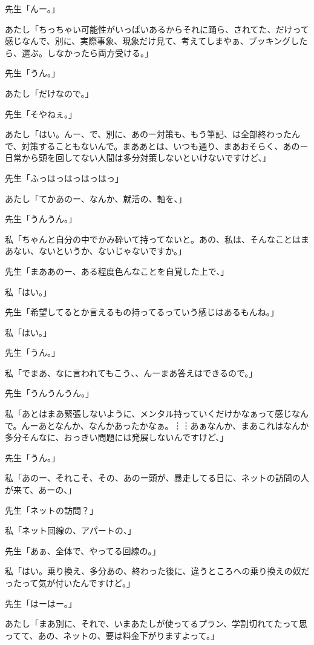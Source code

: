 \documentclass[b5j,twoside,twocolumn]{utarticle}
\begin{document}
\begin{description}
\item 先生「んー。」
\item あたし「ちっちゃい可能性がいっぱいあるからそれに踊ら、されてた、だけって感じなんで、別に、実際事象、現象だけ見て、考えてしまやぁ、ブッキングしたら、選ぶ。しなかったら両方受ける。」
\item 先生「うん。」
\item あたし「だけなので。」
\item 先生「そやねぇ。」
\item あたし「はい。んー、で、別に、あのー対策も、もう筆記、は全部終わったんで、対策することもないんで。まああとは、いつも通り、まあおそらく、あのー日常から頭を回してない人間は多分対策しないといけないですけど、」
\item 先生「ふっはっはっはっはっ」
\item あたし「てかあのー、なんか、就活の、軸を、」
\item 先生「うんうん。」
\item 私「ちゃんと自分の中でかみ砕いて持ってないと。あの、私は、そんなことはまあない、ないというか、ないじゃないですか。」
\item 先生「まああのー、ある程度色んなことを自覚した上で、」
\item 私「はい。」
\item 先生「希望してるとか言えるもの持ってるっていう感じはあるもんね。」
\item 私「はい。」
\item 先生「うん。」
\item 私「でまあ、なに言われてもこう、、んーまあ答えはできるので。」
\item 先生「うんうんうん。」
\item 私「あとはまあ緊張しないように、メンタル持っていくだけかなぁって感じなんで。んーあとなんか、なんかあったかなぁ。︙︙あぁなんか、まあこれはなんか多分そんなに、おっきい問題には発展しないんですけど、」
\item 先生「うん。」
\item 私「あのー、それこそ、その、あのー頭が、暴走してる日に、ネットの訪問の人が来て、あーの、」
\item 先生「ネットの訪問？」
\item 私「ネット回線の、アパートの、」
\item 先生「あぁ、全体で、やってる回線の。」
\item 私「はい。乗り換え、多分あの、終わった後に、違うところへの乗り換えの奴だったって気が付いたんですけど。」
\item 先生「はーはー。」
\item あたし「まあ別に、それで、いまあたしが使ってるプラン、学割切れてたって思ってて、あの、ネットの、要は料金下がりますよって。」

\end{description}
\end{document}
